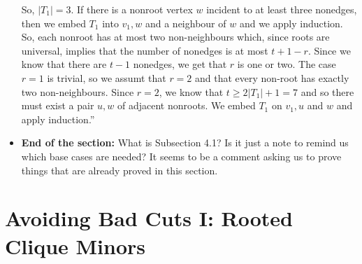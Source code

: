 \documentclass[11 pt]{article}
\theoremstyle{definition}
\theoremstyle{case}
\numberwithin{equation}{section}
\begin{document}
\begin{itemize}
So, $|T_1|=3$. If there is a nonroot vertex $w$ incident to at least three nonedges, then we embed $T_1$ into $v_1,w$ and a neighbour of $w$ and we apply induction. So, each nonroot has at most two non-neighbours which, since roots are universal, implies that the number of nonedges is at most $t+1-r$. Since we know that there are $t-1$ nonedges, we get that $r$ is one or two. The case $r=1$ is trivial, so we assumt that $r=2$ and that every non-root has exactly two non-neighbours. Since $r=2$, we know that $t\geq 2|T_1|+1 = 7$ and so there must exist a pair $u,w$ of adjacent nonroots. We embed $T_1$ on $v_1,u$ and $w$ and apply induction.''

\item \textbf{End of the section:} What is Subsection 4.1? Is it just a note to remind us which base cases are needed? It seems to be a comment asking us to prove things that are already proved in this section.  
\end{itemize}

\section{Avoiding Bad Cuts I: Rooted Clique Minors}
\end{document}
